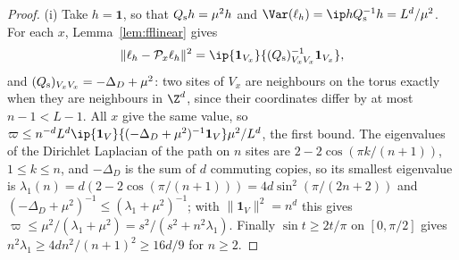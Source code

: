 \begin{proof}
(i) Take $h=\mathbf 1$, so that $Q_{\rm s}h=\mu^2h$ and $\Var(\ell_h)=
\ip h{Q_{\rm s}^{-1}h}=L^d/\mu^2$. For each $x$, Lemma~\ref{lem:fflinear} gives
\[
\lVert\ell_h-\mathcal P_x\ell_h\rVert^2=\ip{\mathbf 1_{V_x}}{(Q_{\rm s})
_{V_xV_x}^{-1}\mathbf 1_{V_x}},
\]
and $(Q_{\rm s})_{V_xV_x}=-\Delta_D+\mu^2$: two
sites of $V_x$ are neighbours on the torus exactly when they are neighbours
in $\Z^d$, since their coordinates differ by at most $n-1<L-1$. All $x$ give
the same value, so $\varpi\le n^{-d}L^d\ip{\mathbf 1_V}{(-\Delta_D+\mu^2)^{-1}
\mathbf 1_V}\mu^2/L^d$, the first bound. The eigenvalues of the Dirichlet
Laplacian of the path on $n$ sites are $2-2\cos(\pi k/(n+1))$, $1\le k\le n$,
and $-\Delta_D$ is the sum of $d$ commuting copies, so its smallest
eigenvalue is $\lambda_1(n)=d(2-2\cos(\pi/(n+1)))=4d\sin^2(\pi/(2n+2))$ and
$(-\Delta_D+\mu^2)^{-1}\le(\lambda_1+\mu^2)^{-1}$; with $\lVert\mathbf 1_V
\rVert^2=n^d$ this gives $\varpi\le\mu^2/(\lambda_1+\mu^2)=s^2/(s^2+n^2
\lambda_1)$. Finally $\sin t\ge2t/\pi$ on $[0,\pi/2]$ gives $n^2\lambda_1\ge
4dn^2/(n+1)^2\ge16d/9$ for $n\ge2$.


\end{proof}
